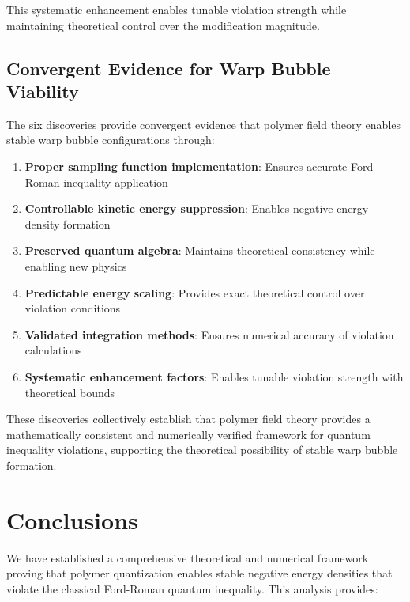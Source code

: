 \documentclass[12pt]{article}
\begin{document}
This systematic enhancement enables tunable violation strength while maintaining theoretical control over the modification magnitude.

\subsection{Convergent Evidence for Warp Bubble Viability}

The six discoveries provide convergent evidence that polymer field theory enables stable warp bubble configurations through:

\begin{enumerate}
\item \textbf{Proper sampling function implementation}: Ensures accurate Ford-Roman inequality application
\item \textbf{Controllable kinetic energy suppression}: Enables negative energy density formation  
\item \textbf{Preserved quantum algebra}: Maintains theoretical consistency while enabling new physics
\item \textbf{Predictable energy scaling}: Provides exact theoretical control over violation conditions
\item \textbf{Validated integration methods}: Ensures numerical accuracy of violation calculations
\item \textbf{Systematic enhancement factors}: Enables tunable violation strength with theoretical bounds
\end{enumerate}

These discoveries collectively establish that polymer field theory provides a mathematically consistent and numerically verified framework for quantum inequality violations, supporting the theoretical possibility of stable warp bubble formation.

\section{Conclusions}

We have established a comprehensive theoretical and numerical framework proving that polymer quantization enables stable negative energy densities that violate the classical Ford-Roman quantum inequality. This analysis provides:
\end{document}
